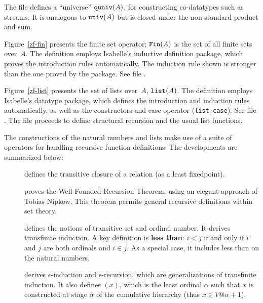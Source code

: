 The file  defines a ``universe'' ${\tt quniv}(A)$,
for constructing co-datatypes such as streams.  It is analogous to ${\tt
  univ}(A)$ but is closed under the non-standard product and sum.

Figure~\ref{zf-fin} presents the finite set operator; ${\tt Fin}(A)$ is the
set of all finite sets over~$A$.  The definition employs Isabelle's
inductive definition package, which proves the introduction rules
automatically.  The induction rule shown is stronger than the one proved by
the package.  See file .

Figure~\ref{zf-list} presents the set of lists over~$A$, ${\tt list}(A)$.
The definition employs Isabelle's datatype package, which defines the
introduction and induction rules automatically, as well as the constructors
and case operator (\verb|list_case|).  See file .
The file  proceeds to define structural
recursion and the usual list functions.

The constructions of the natural numbers and lists make use of a suite of
operators for handling recursive function definitions.  The developments are
summarized below:
\begin{description}
\item[]
defines the transitive closure of a relation (as a least fixedpoint).

\item[]
proves the Well-Founded Recursion Theorem, using an elegant
approach of Tobias Nipkow.  This theorem permits general recursive
definitions within set theory.

\item[] defines the notions of transitive set and
  ordinal number.  It derives transfinite induction.  A key definition is
  {\bf less than}: $i<j$ if and only if $i$ and $j$ are both ordinals and
  $i\in j$.  As a special case, it includes less than on the natural
  numbers.

\item[]
derives $\epsilon$-induction and $\epsilon$-recursion, which are
generalizations of transfinite induction.  It also defines
$(x)$, which is the least ordinal $\alpha$ such that $x$
is constructed at stage $\alpha$ of the cumulative hierarchy (thus $x\in
V@{\alpha+1}$).
\end{description}


